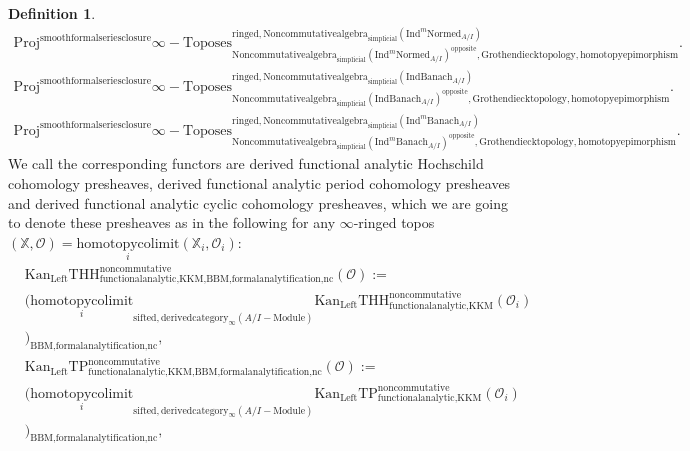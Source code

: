 \documentclass[11pt]{book}
\theoremstyle{definition}
\newtheorem{definition}[theorem]{Definition}
\numberwithin{equation}{section}
\begin{document}
\begin{definition}
\begin{align}
\mathrm{Proj}^\text{smoothformalseriesclosure}\infty-\mathrm{Toposes}^{\mathrm{ringed},\mathrm{Noncommutativealgebra}_{\mathrm{simplicial}}(\mathrm{Ind}^m\mathrm{Normed}_{A/I})}_{\mathrm{Noncommutativealgebra}_{\mathrm{simplicial}}(\mathrm{Ind}^m\mathrm{Normed}_{A/I})^\mathrm{opposite},\mathrm{Grothendiecktopology,homotopyepimorphism}}.\\
\mathrm{Proj}^\text{smoothformalseriesclosure}\infty-\mathrm{Toposes}^{\mathrm{ringed},\mathrm{Noncommutativealgebra}_{\mathrm{simplicial}}(\mathrm{Ind}\mathrm{Banach}_{A/I})}_{\mathrm{Noncommutativealgebra}_{\mathrm{simplicial}}(\mathrm{Ind}\mathrm{Banach}_{A/I})^\mathrm{opposite},\mathrm{Grothendiecktopology,homotopyepimorphism}}.\\
\mathrm{Proj}^\text{smoothformalseriesclosure}\infty-\mathrm{Toposes}^{\mathrm{ringed},\mathrm{Noncommutativealgebra}_{\mathrm{simplicial}}(\mathrm{Ind}^m\mathrm{Banach}_{A/I})}_{\mathrm{Noncommutativealgebra}_{\mathrm{simplicial}}(\mathrm{Ind}^m\mathrm{Banach}_{A/I})^\mathrm{opposite},\mathrm{Grothendiecktopology,homotopyepimorphism}}. 
\end{align}
We call the corresponding functors are derived functional analytic Hochschild cohomology presheaves, derived functional analytic period cohomology presheaves and derived functional analytic cyclic cohomology presheaves, which we are going to denote these presheaves as in the following for any $\infty$-ringed topos $(\mathbb{X},\mathcal{O})=\underset{i}{\text{homotopycolimit}}(\mathbb{X}_i,\mathcal{O}_i)$:
\begin{align}
	&\mathrm{Kan}_{\mathrm{Left}}\mathrm{THH}^\mathrm{noncommutative}_{\text{functionalanalytic,KKM},\text{BBM,formalanalytification,nc}}(\mathcal{O}):=\\
	&(\underset{i}{\text{homotopycolimit}}_{\text{sifted},\text{derivedcategory}_{\infty}(A/I-\text{Module})}\mathrm{Kan}_{\mathrm{Left}}\mathrm{THH}^\mathrm{noncommutative}_{\text{functionalanalytic,KKM}}(\mathcal{O}_i)\\
	&)_\text{BBM,formalanalytification,nc},\\
	&\mathrm{Kan}_{\mathrm{Left}}\mathrm{TP}^\mathrm{noncommutative}_{\text{functionalanalytic,KKM},\text{BBM,formalanalytification,nc}}(\mathcal{O}):=\\
	&(\underset{i}{\text{homotopycolimit}}_{\text{sifted},\text{derivedcategory}_{\infty}(A/I-\text{Module})}\mathrm{Kan}_{\mathrm{Left}}\mathrm{TP}^\mathrm{noncommutative}_{\text{functionalanalytic,KKM}}(\mathcal{O}_i)\\
	&)_\text{BBM,formalanalytification,nc},\\

\end{align}
\end{definition}
\end{document}
